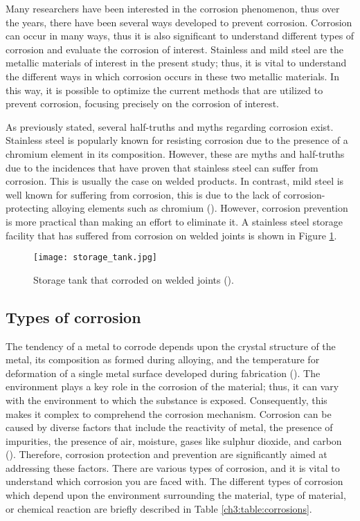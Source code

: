 Many researchers have been interested in the corrosion phenomenon, thus over the years, there have been several ways developed to prevent corrosion. Corrosion can occur in many ways, thus it is also significant to understand different types of corrosion and evaluate the corrosion of interest. Stainless and mild steel are the metallic materials of interest in the present study; thus, it is vital to understand the different ways in which corrosion occurs in these two metallic materials. In this way, it is possible to optimize the current methods that are utilized to prevent corrosion, focusing precisely on the corrosion of interest.

As previously stated, several half-truths and myths regarding corrosion exist. Stainless steel is popularly known for resisting corrosion due to the presence of a chromium element in its composition. However, these are myths and half-truths due to the incidences that have proven that stainless steel can suffer from corrosion. This is usually the case on welded products. In contrast, mild steel is well known for suffering from corrosion, this is due to the lack of corrosion-protecting alloying elements such as chromium (\cite{hackerman1987theory}). However, corrosion prevention is more practical than making an effort to eliminate it. A stainless steel storage facility that has suffered from corrosion on welded joints is shown in Figure \ref{ch3:figure:tank}.
 
\begin{figure}[H]
    \centering
    \texttt{[image: storage\_tank.jpg]}
    \caption{Storage tank that corroded on welded joints (\cite{karayan2014weld}).}
    \label{ch3:figure:tank}
\end{figure}

\subsection{Types of corrosion} 
The tendency of a metal to corrode depends upon the crystal structure of the metal, its composition as formed during alloying, and the temperature for deformation of a single metal surface developed during fabrication (\cite{sourmail2005stainless}). The environment plays a key role in the corrosion of the material; thus, it can vary with the environment to which the substance is exposed. Consequently, this makes it complex to comprehend the corrosion mechanism. Corrosion can be caused by diverse factors that include the reactivity of metal, the presence of impurities, the presence of air, moisture, gases like sulphur dioxide, and carbon (\cite{sourmail2005stainless}). Therefore, corrosion protection and prevention are significantly aimed at addressing these factors. There are various types of corrosion, and it is vital to understand which corrosion you are faced with. The different types of corrosion which depend upon the environment surrounding the material, type of material, or chemical reaction are briefly described in Table \ref{ch3:table:corrosions}.

